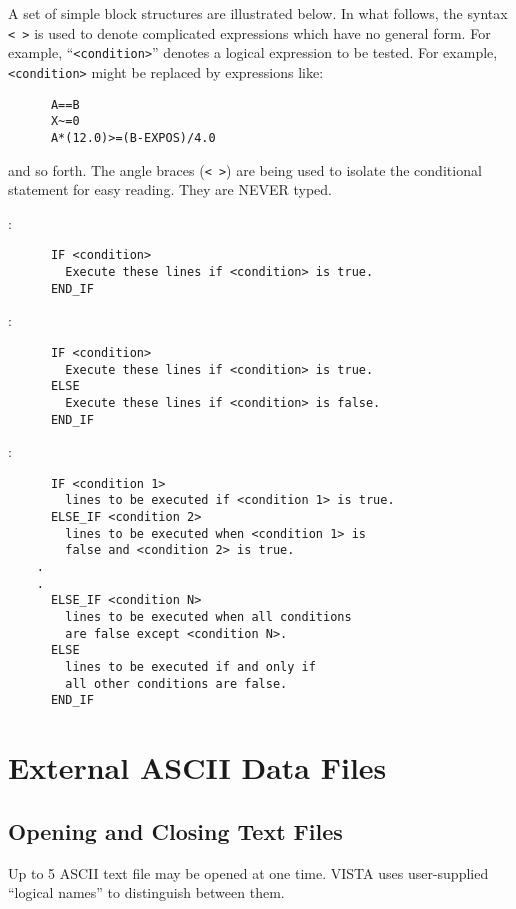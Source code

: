 A set of simple  block structures are illustrated below.  In what
follows, the syntax \verb+< >+ is used to denote complicated expressions which
have no general form.  For example, ``\verb+<condition>+'' denotes a logical
expression to be tested.  For example, \verb+<condition>+ might be replaced by
expressions like:
\begin{verbatim}
      A==B
      X~=0
      A*(12.0)>=(B-EXPOS)/4.0
\end{verbatim}
and so forth.  The angle braces (\verb+< >+) are being used to isolate the
conditional statement for easy reading.  They are NEVER typed.

\noindent {}:
\begin{verbatim}
      IF <condition>
	    Execute these lines if <condition> is true.
      END_IF
\end{verbatim}

\noindent {}:
\begin{verbatim}
      IF <condition>
	    Execute these lines if <condition> is true.
      ELSE
	    Execute these lines if <condition> is false.
      END_IF
\end{verbatim}


\noindent {}:
\begin{verbatim}
      IF <condition 1>
	    lines to be executed if <condition 1> is true.
      ELSE_IF <condition 2>
	    lines to be executed when <condition 1> is
	    false and <condition 2> is true.
	.
	.
      ELSE_IF <condition N>
	    lines to be executed when all conditions
	    are false except <condition N>.
      ELSE
	    lines to be executed if and only if
	    all other conditions are false.
      END_IF
\end{verbatim}


\section{External ASCII Data Files}

\subsection{Opening and Closing Text Files}

Up to 5 ASCII text file may be opened at one time.  VISTA uses user-supplied
``logical names'' to distinguish between them.

